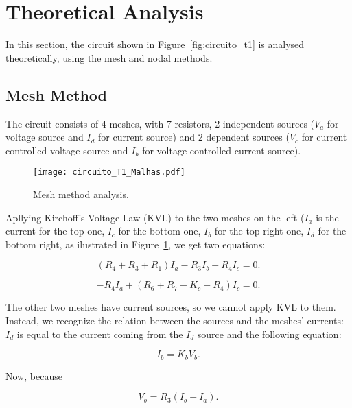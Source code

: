 \section{Theoretical Analysis}
\label{sec:analysis}

In this section, the circuit shown in Figure~\ref{fig:circuito_t1} is analysed
theoretically, using the mesh and nodal methods.

\subsection{Mesh Method}

The circuit consists of 4 meshes, with 7 resistors, 2 independent sources ($V_a$ for voltage source and $I_d$ for current source) and 2 dependent sources ($V_c$ for current controlled voltage source and $I_b$ for voltage controlled current source).

\begin{figure}[h] \centering
\texttt{[image: circuito\_T1\_Malhas.pdf]}
\caption{Mesh method analysis.}
\label{fig:malha}
\end{figure}

Apllying Kirchoff's Voltage Law (KVL) to the two meshes on the left ($I_a$ is the current for the top one, $I_c$ for the bottom one, $I_b$ for the top right one, $I_d$ for the bottom right, as ilustrated in Figure~\ref{fig:malha}, we get two equations:

\begin{equation}
  (R_4+R_3+R_1)I_a-R_3I_b-R_4I_c=0.
  \label{eq:kvl1}
\end{equation}

\begin{equation}
  -R_4I_a+(R_6+R_7-K_c+R_4)I_c=0.
  \label{eq:kvl2}
\end{equation}


The other two meshes have current sources, so we cannot apply KVL to them. Instead, we recognize the relation between the sources and the meshes' currents: $I_d$ is equal to the current coming from the $I_d$ source and the following equation: 

\begin{equation}
  I_b=K_bV_b.
\end{equation}

Now, because

\begin{equation}
  V_b=R_3(I_b-I_a).
\end{equation}
 
